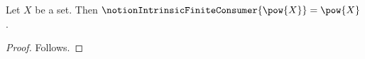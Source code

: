 

\begin{proposition}\label{notion_intrinsic_powerset_result_missing}
    Let $X$ be a set.
    Then $\notionIntrinsicFiniteConsumer{\pow{X}}=\pow{X}$.
\end{proposition}
\begin{proof}
    Follows.
\end{proof}
